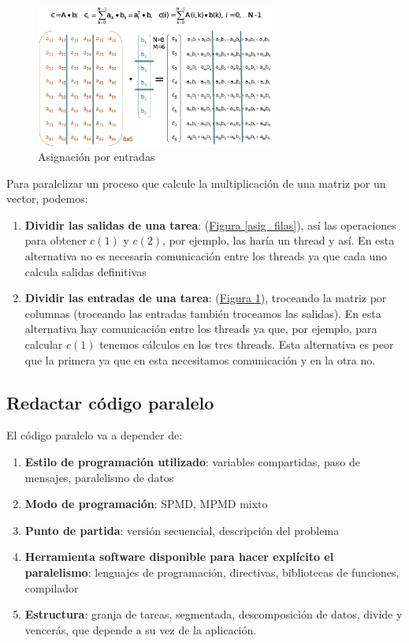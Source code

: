 \documentclass[10pt,a4paper,spanish]{report}
\begin{document}
\begin{figure}[!h]
    \centering
    \includegraphics[width=0.7\textwidth]{46}
    \caption{Asignación por entradas}
    \label{asig_columnas}
\end{figure}

Para paralelizar un proceso que calcule la multiplicación de una matriz por un vector, podemos:
\begin{enumerate}[\color{azul}{\bf $\heartsuit$}]
    \item \textcolor[rgb]{0.2,0.4,0.8}{\textbf{Dividir las salidas de una tarea}}: (\hyperref[asig_filas]{Figura \ref*{asig_filas}}), así las operaciones para obtener $c(1)$ y $c(2)$, por ejemplo, las haría un thread y así. En esta alternativa no es necesaria comunicación entre los threads ya que cada uno calcula salidas definitivas
    \item \textcolor[rgb]{0.2,0.4,0.8}{\textbf{Dividir las entradas de una tarea}}: (\hyperref[asig_columnas]{Figura \ref*{asig_columnas}}), troceando la matriz por columnas (troceando las entradas también troceamos las salidas). En esta alternativa hay comunicación entre los threads ya que, por ejemplo, para calcular $c(1)$ tenemos cálculos en los tres threads. Esta alternativa es peor que la primera ya que en esta necesitamos comunicación y en la otra no.
\end{enumerate}

\textcolor[rgb]{0.2,0.4,0.8}{\subsection{Redactar código paralelo}}
El código paralelo va a depender de:
\begin{enumerate}[\color{azul}{\bf $\heartsuit$}]
    \item \textcolor[rgb]{0.2,0.4,0.8}{\textbf{Estilo de programación utilizado}}: variables compartidas, paso de mensajes, paralelismo de datos
    \item \textcolor[rgb]{0.2,0.4,0.8}{\textbf{Modo de programación}}: SPMD, MPMD mixto
    \item \textcolor[rgb]{0.2,0.4,0.8}{\textbf{Punto de partida}}: versión secuencial, descripción del problema
    \item \textcolor[rgb]{0.2,0.4,0.8}{\textbf{Herramienta software disponible para hacer explícito el paralelismo}}: lenguajes de programación, directivas, bibliotecas de funciones, compilador
    \item \textcolor[rgb]{0.2,0.4,0.8}{\textbf{Estructura}}: granja de tareas, segmentada, descomposición de datos, divide y vencerás, que depende a su vez de la aplicación.
\end{enumerate}
\end{document}

